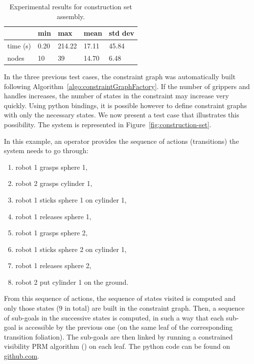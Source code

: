 \begin{table}
  \begin{center}
  \begin{tabular}{|l|l|l|l|l|}
    \hline
    & min & max & mean & std dev \\
    \hline
    time (s) & 0.20 & 214.22 & 17.11 & 45.84 \\
    nodes & 10 &  39 & 14.70 & 6.48 \\
    \hline
  \end{tabular}
  \end{center}
  \caption{Experimental results for construction set assembly.}
  \label{tab:construction-set}
\end{table}

In the three previous test cases, the constraint graph was automatically built
following Algorithm~\ref{algo:constraintGraphFactory}. If the number of grippers
and handles increases, the number of states in the constraint may increase very
quickly. Using python bindings, it is possible however to define constraint
graphs with only the necessary states. We now present a test case that
illustrates this possibility. The system is represented in Figure~\ref{fig:construction-set}.

In this example, an operator provides the sequence of actions (transitions)
the system needs to go through:
\begin{enumerate}
\item robot 1 grasps sphere 1,
\item robot 2 grasps cylinder 1,
\item robot 1 sticks sphere 1 on cylinder 1,
\item robot 1 releases sphere 1,
\item robot 1 grasps sphere 2,
\item robot 1 sticks sphere 2 on cylinder 1,
\item robot 1 releases sphere 2,
\item robot 2 put cylinder 1 on the ground.
\end{enumerate}
From this sequence of actions, the sequence of states visited is
computed and only those states (9 in total) are built in the
constraint graph. Then, a sequence of sub-goals in the successive
states is computed, in such a way that each sub-goal is accessible by
the previous one (on the same leaf of the corresponding transition
foliation). The sub-goals are then linked by running a constrained visibility
PRM algorithm (\cite{SimLauNis00}) on each leaf. The python code can be found
on \href{https://github.com/humanoid-path-planner/hpp_benchmark/blob/master/2020-07-23/construction-set/script.py}{github.com}.

